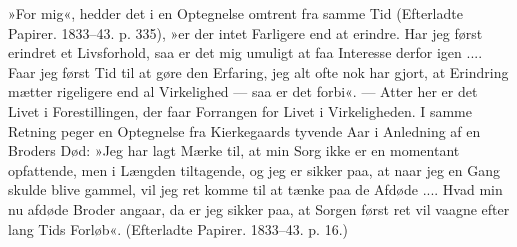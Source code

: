 \documentclass[12pt,a4paper,openany]{book}
\begin{document}
»For mig«, hedder det i en Optegnelse omtrent fra
samme Tid (Efterladte Papirer. 1833--43. p. 335), »er
der intet Farligere end at erindre. Har jeg først erindret
et Livsforhold, saa er det mig umuligt at faa Interesse
derfor igen .... Faar jeg først Tid til at gøre
den Erfaring, jeg alt ofte nok har gjort, at Erindring
mætter rigeligere end al Virkelighed --- saa er det forbi«.
--- Atter her er det Livet i Forestillingen, der faar Forrangen
for Livet i Virkeligheden. I samme Retning
peger en Optegnelse fra Kierkegaards tyvende Aar i
Anledning af en Broders Død: »Jeg har lagt Mærke til,
at min Sorg ikke er en momentant opfattende, men i
Længden tiltagende, og jeg er sikker paa, at naar jeg
en Gang skulde blive gammel, vil jeg ret komme til at
tænke paa de Afdøde .... Hvad min nu afdøde Broder
angaar, da er jeg sikker paa, at Sorgen først ret vil
vaagne efter lang Tids Forløb«. (Efterladte Papirer.
1833--43. p. 16.)
\end{document}
